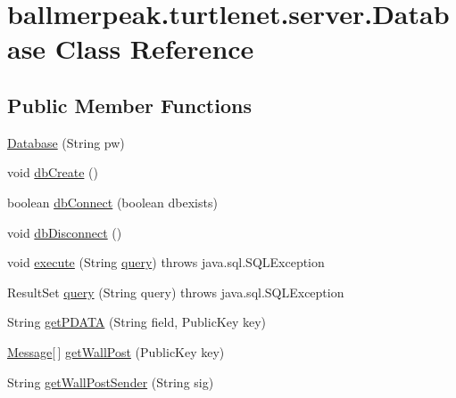 \hypertarget{classballmerpeak_1_1turtlenet_1_1server_1_1Database}{\section{ballmerpeak.\-turtlenet.\-server.\-Database Class Reference}
\label{classballmerpeak_1_1turtlenet_1_1server_1_1Database}
}
\subsection*{Public Member Functions}
\begin{DoxyCompactItemize}
\item 
\hyperlink{classballmerpeak_1_1turtlenet_1_1server_1_1Database_a2df6c740699204eafab513d8990f14a8}{Database} (String pw)
\item 
void \hyperlink{classballmerpeak_1_1turtlenet_1_1server_1_1Database_af796c23330bbae7271011b0e81901643}{db\-Create} ()
\item 
boolean \hyperlink{classballmerpeak_1_1turtlenet_1_1server_1_1Database_a80e93295b9fd81f2a3c73bcaa2df39ee}{db\-Connect} (boolean dbexists)
\item 
void \hyperlink{classballmerpeak_1_1turtlenet_1_1server_1_1Database_a1900530bc7bf5c275a275b788086f6ec}{db\-Disconnect} ()
\item 
void \hyperlink{classballmerpeak_1_1turtlenet_1_1server_1_1Database_a717872aaaaf6529490c31465f2952219}{execute} (String \hyperlink{classballmerpeak_1_1turtlenet_1_1server_1_1Database_a4401c37a89ca60d2e6b926b9930446dc}{query})  throws java.\-sql.\-S\-Q\-L\-Exception 
\item 
Result\-Set \hyperlink{classballmerpeak_1_1turtlenet_1_1server_1_1Database_a4401c37a89ca60d2e6b926b9930446dc}{query} (String query)  throws java.\-sql.\-S\-Q\-L\-Exception 
\item 
String \hyperlink{classballmerpeak_1_1turtlenet_1_1server_1_1Database_ab2e0d804fa40eb9b08275f2548737b34}{get\-P\-D\-A\-T\-A} (String field, Public\-Key key)
\item 
\hyperlink{classballmerpeak_1_1turtlenet_1_1shared_1_1Message}{Message}\mbox{[}$\,$\mbox{]} \hyperlink{classballmerpeak_1_1turtlenet_1_1server_1_1Database_a095f1356c13e33debb06929244b98150}{get\-Wall\-Post} (Public\-Key key)
\item 
String \hyperlink{classballmerpeak_1_1turtlenet_1_1server_1_1Database_a6c5618c6a7e144ee7eec9e6e4de6314d}{get\-Wall\-Post\-Sender} (String sig)

\end{DoxyCompactItemize}
